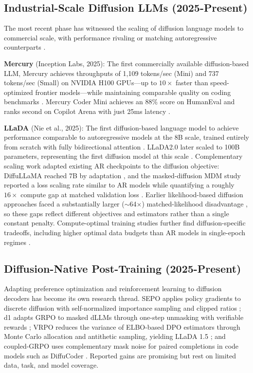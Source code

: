 \documentclass[11pt]{article}
\begin{document}
\subsection{Industrial-Scale Diffusion LLMs (2025-Present)}

The most recent phase has witnessed the scaling of diffusion language models to commercial scale, with performance rivaling or matching autoregressive counterparts \cite{yu2025discrete}.

\textbf{Mercury} (Inception Labs, 2025): The first commercially available diffusion-based LLM, Mercury achieves throughputs of 1,109 tokens/sec (Mini) and 737 tokens/sec (Small) on NVIDIA H100 GPUs---up to $10\times$ faster than speed-optimized frontier models---while maintaining comparable quality on coding benchmarks \cite{khanna2025mercury}. Mercury Coder Mini achieves an 88\% score on HumanEval and ranks second on Copilot Arena with just 25ms latency \cite{khanna2025mercury}.

\textbf{LLaDA} (Nie et al., 2025): The first diffusion-based language model to achieve performance comparable to autoregressive models at the 8B scale, trained entirely from scratch with fully bidirectional attention \cite{nie2025large}. LLaDA2.0 later scaled to 100B parameters, representing the first diffusion model at this scale \cite{nie2025large}. Complementary scaling work adapted existing AR checkpoints to the diffusion objective: DiffuLLaMA reached 7B by adaptation \cite{gong2024diffullama}, and the masked-diffusion MDM study reported a loss scaling rate similar to AR models while quantifying a roughly $16\times$ compute gap at matched validation loss \cite{nie2024mdm}. Earlier likelihood-based diffusion approaches faced a substantially larger ($\sim$64$\times$) matched-likelihood disadvantage \cite{gulrajani2023plaid}, so these gaps reflect different objectives and estimators rather than a single constant penalty. Compute-optimal training studies further find diffusion-specific tradeoffs, including higher optimal data budgets than AR models in single-epoch regimes \cite{ni2025quokka}.

\subsection{Diffusion-Native Post-Training (2025-Present)}

Adapting preference optimization and reinforcement learning to diffusion decoders has become its own research thread. SEPO applies policy gradients to discrete diffusion with self-normalized importance sampling and clipped ratios \cite{zekri2025sepo}; d1 adapts GRPO to masked dLLMs through one-step unmasking with verifiable rewards \cite{zhao2025d1}; VRPO reduces the variance of ELBO-based DPO estimators through Monte Carlo allocation and antithetic sampling, yielding LLaDA 1.5 \cite{zhu2025llada15}; and coupled-GRPO uses complementary mask noise for paired completions in code models such as DiffuCoder \cite{gong2025diffucoder}. Reported gains are promising but rest on limited data, task, and model coverage.
\end{document}
